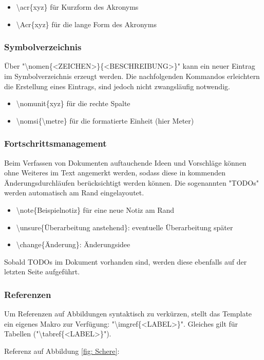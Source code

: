 \begin{itemize}
  \item \textbackslash{}acr\{xyz\} für Kurzform des Akronyms
  \item \textbackslash{}Acr\{xyz\} für die lange Form des Akronyms
\end{itemize}

\subsubsection{Symbolverzeichnis}

Über "\textbackslash{}nomen\{<ZEICHEN>\}\{<BESCHREIBUNG>\}" kann ein neuer Eintrag im
Symbolverzeichnis erzeugt werden. Die nachfolgenden Kommandos erleichtern die Erstellung
eines Eintrags, sind jedoch nicht zwangsläufig notwendig.

\begin{itemize}
  \item \textbackslash{}nomunit\{xyz\} für die rechte Spalte
  \item \textbackslash{}nomsi\{\textbackslash{}metre\} für die formatierte Einheit (hier Meter)
\end{itemize}

\subsubsection{Fortschrittsmanagement}

Beim Verfassen von Dokumenten auftauchende Ideen und Vorschläge können ohne Weiteres
im Text angemerkt werden, sodass diese in kommenden Änderungsdurchläufen berücksichtigt werden können.
Die sogenannten "TODOs" werden automatisch am Rand eingelayoutet.

\begin{itemize}
  \item {}\textbackslash{}note\{Beispielnotiz\} für eine neue Notiz am Rand
  \item {}\textbackslash{}unsure\{Überarbeitung anstehend\}: eventuelle Überarbeitung später
  \item {}\textbackslash{}change\{Änderung\}: Änderungsidee
\end{itemize}

Sobald TODOs im Dokument vorhanden sind, werden diese ebenfalls auf der letzten Seite aufgeführt.

\subsubsection{Referenzen}

Um Referenzen auf Abbildungen syntaktisch zu verkürzen, stellt das Template
ein eigenes Makro zur Verfügung: "\textbackslash{}imgref\{<LABEL>\}". Gleiches gilt
für Tabellen ("\textbackslash{}tabref\{<LABEL>\}").

Referenz auf Abbildung \ref{fig: Schere}: \\